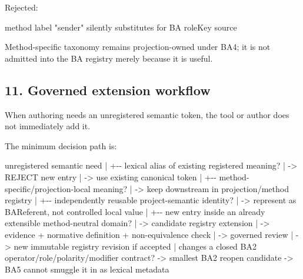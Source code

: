 \documentclass[
  10pt,
  a4paper,
]{article}
\newenvironment{Shaded}{}{}
\newcommand{\NormalTok}[1]{#1}
\begin{document}
Rejected:

\begin{Shaded}
\begin{Highlighting}[]
\NormalTok{method label "sender"}
\NormalTok{  silently substitutes for BA roleKey source}
\end{Highlighting}
\end{Shaded}

Method-specific taxonomy remains projection-owned under BA4; it is not
admitted into the BA registry merely because it is useful.

\subsection{11. Governed extension
workflow}\label{governed-extension-workflow}

When authoring needs an unregistered semantic token, the tool or author
does not immediately add it.

The minimum decision path is:

\begin{Shaded}
\begin{Highlighting}[]
\NormalTok{unregistered semantic need}
\NormalTok{    |}
\NormalTok{    +{-}{-} lexical alias of existing registered meaning?}
\NormalTok{    |      {-}\textgreater{} REJECT new entry}
\NormalTok{    |      {-}\textgreater{} use existing canonical token}
\NormalTok{    |}
\NormalTok{    +{-}{-} method{-}specific/projection{-}local meaning?}
\NormalTok{    |      {-}\textgreater{} keep downstream in projection/method registry}
\NormalTok{    |}
\NormalTok{    +{-}{-} independently reusable project{-}semantic identity?}
\NormalTok{    |      {-}\textgreater{} represent as BAReferent, not controlled local value}
\NormalTok{    |}
\NormalTok{    +{-}{-} new entry inside an already extensible method{-}neutral domain?}
\NormalTok{    |      {-}\textgreater{} candidate registry extension}
\NormalTok{    |      {-}\textgreater{} evidence + normative definition + non{-}equivalence check}
\NormalTok{    |      {-}\textgreater{} governed review}
\NormalTok{    |      {-}\textgreater{} new immutable registry revision if accepted}
\NormalTok{    |}
\NormalTok{    \textasciigrave{}{-}{-} changes a closed BA2 operator/role/polarity/modifier contract?}
\NormalTok{           {-}\textgreater{} smallest BA2 reopen candidate}
\NormalTok{           {-}\textgreater{} BA5 cannot smuggle it in as lexical metadata}
\end{Highlighting}
\end{Shaded}
\end{document}
